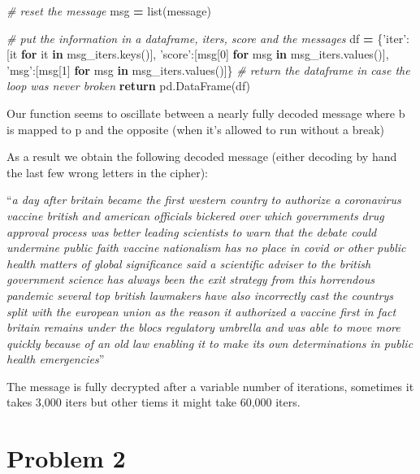 \documentclass[]{article}
\newenvironment{Shaded}{\begin{snugshade}}{\end{snugshade}}
\newcommand{\BuiltInTok}[1]{#1}
\newcommand{\CommentTok}[1]{\textcolor[rgb]{0.56,0.35,0.01}{\textit{#1}}}
\newcommand{\ControlFlowTok}[1]{\textcolor[rgb]{0.13,0.29,0.53}{\textbf{#1}}}
\newcommand{\DecValTok}[1]{\textcolor[rgb]{0.00,0.00,0.81}{#1}}
\newcommand{\KeywordTok}[1]{\textcolor[rgb]{0.13,0.29,0.53}{\textbf{#1}}}
\newcommand{\NormalTok}[1]{#1}
\newcommand{\OperatorTok}[1]{\textcolor[rgb]{0.81,0.36,0.00}{\textbf{#1}}}
\newcommand{\StringTok}[1]{\textcolor[rgb]{0.31,0.60,0.02}{#1}}
\begin{document}
\begin{Shaded}
\begin{Highlighting}[]
        \CommentTok{# reset the message}
\NormalTok{        msg }\OperatorTok{=} \BuiltInTok{list}\NormalTok{(message)}

    \CommentTok{# put the information in a dataframe, iters, score and the messages}
\NormalTok{    df }\OperatorTok{=}\NormalTok{ \{}\StringTok{'iter'}\NormalTok{:[it }\ControlFlowTok{for}\NormalTok{ it }\KeywordTok{in}\NormalTok{ msg_iters.keys()],}
          \StringTok{'score'}\NormalTok{:[msg[}\DecValTok{0}\NormalTok{] }\ControlFlowTok{for}\NormalTok{ msg }\KeywordTok{in}\NormalTok{ msg_iters.values()],}
          \StringTok{'msg'}\NormalTok{:[msg[}\DecValTok{1}\NormalTok{] }\ControlFlowTok{for}\NormalTok{ msg }\KeywordTok{in}\NormalTok{ msg_iters.values()]\}}
    \CommentTok{# return the dataframe in case the loop was never broken}
    \ControlFlowTok{return}\NormalTok{ pd.DataFrame(df)}
\end{Highlighting}
\end{Shaded}

Our function seems to oscillate between a nearly fully decoded message
where b is mapped to p and the opposite (when it's allowed to run
without a break)

As a result we obtain the following decoded message (either decoding by
hand the last few wrong letters in the cipher):

``\emph{a day after britain became the first western country to
authorize a coronavirus vaccine british and american officials bickered
over which governments drug approval process was better leading
scientists to warn that the debate could undermine public faith vaccine
nationalism has no place in covid or other public health matters of
global significance said a scientific adviser to the british government
science has always been the exit strategy from this horrendous pandemic
several top british lawmakers have also incorrectly cast the countrys
split with the european union as the reason it authorized a vaccine
first in fact britain remains under the blocs regulatory umbrella and
was able to move more quickly because of an old law enabling it to make
its own determinations in public health emergencies}''

The message is fully decrypted after a variable number of iterations,
sometimes it takes 3,000 iters but other tiems it might take 60,000
iters.

\newpage

\hypertarget{problem-2}{%
\section{Problem 2}\label{problem-2}}
\end{document}
